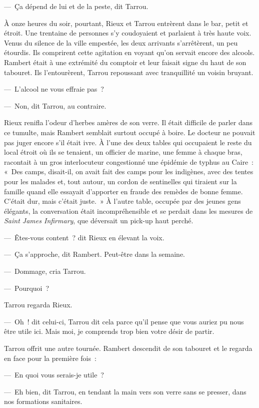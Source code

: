 \documentclass[french,twoside]{book} %
\begin{document}
— Ça dépend de lui et de la peste, dit Tarrou.\par
À onze heures du soir, pourtant, Rieux et Tarrou entrèrent dans le bar, petit et étroit. Une trentaine de personnes s’y coudoyaient et parlaient à très haute voix. Venus du silence de la ville empestée, les deux arrivants s’arrêtèrent, un peu étourdis. Ils comprirent cette agitation en voyant qu’on servait encore des alcools. Rambert était à une extrémité du comptoir et leur faisait signe du haut de son tabouret. Ils l’entourèrent, Tarrou repoussant avec tranquillité un voisin bruyant.\par
— L’alcool ne vous effraie pas ?\par
— Non, dit Tarrou, au contraire.\par
Rieux renifla l’odeur d’herbes amères de son verre. Il était difficile de parler dans ce tumulte, mais Rambert semblait surtout occupé à boire. Le docteur ne pouvait pas juger encore s’il était ivre. À l’une des deux tables qui occupaient le reste du local étroit où ils se tenaient, un officier de marine, une femme à chaque bras, racontait à un gros interlocuteur congestionné une épidémie de typhus au Caire : « Des camps, disait-il, on avait fait des camps pour les indigènes, avec des tentes pour les malades et, tout autour, un cordon de sentinelles qui tiraient sur la famille quand elle essayait d’apporter en fraude des remèdes de bonne femme. C’était dur, mais c’était juste. » À l’autre table, occupée par des jeunes gens élégants, la conversation était incompréhensible et se perdait dans les mesures de \emph{Saint James Infirmary}, que déversait un pick-up haut perché.\par
— Êtes-vous content ? dit Rieux en élevant la voix.\par
— Ça s’approche, dit Rambert. Peut-être dans la semaine.\par
— Dommage, cria Tarrou.\par
— Pourquoi ?\par
Tarrou regarda Rieux.\par
— Oh ! dit celui-ci, Tarrou dit cela parce qu’il pense que vous auriez pu nous être utile ici. Mais moi, je comprends trop bien votre désir de partir.\par
Tarrou offrit une autre tournée. Rambert descendit de son tabouret et le regarda en face pour la première fois :\par
— En quoi vous serais-je utile ?\par
— Eh bien, dit Tarrou, en tendant la main vers son verre sans se presser, dans nos formations sanitaires.\par
\end{document}
